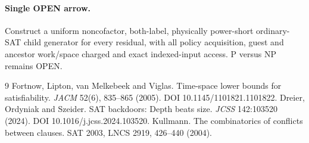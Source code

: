 \documentclass[11pt]{article}
\begin{document}
\paragraph{Single OPEN arrow.} Construct a uniform noncofactor, both-label, physically power-short ordinary-SAT child generator for every residual, with all policy acquisition, guest and ancestor work/space charged and exact indexed-input access. P versus NP remains OPEN.
\begin{thebibliography}{9}
 Fortnow, Lipton, van Melkebeek and Viglas. Time-space lower bounds for satisfiability. \emph{JACM} 52(6), 835--865 (2005). DOI 10.1145/1101821.1101822.
 Dreier, Ordyniak and Szeider. SAT backdoors: Depth beats size. \emph{JCSS} 142:103520 (2024). DOI 10.1016/j.jcss.2024.103520.
 Kullmann. The combinatorics of conflicts between clauses. SAT 2003, LNCS 2919, 426--440 (2004).
\end{thebibliography}
\end{document}
